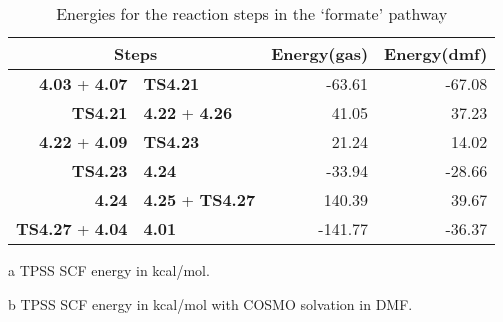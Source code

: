 \begin{table}[!htb]
\centering
 \begin{threeparttable}
  \caption{Energies for the reaction steps in the `formate' pathway}
    \begin{tabular}{r@{ $\rightarrow$ }lrr}
    \toprule
    \multicolumn{2}{c}{Steps} & Energy(gas)\tnote{a} & Energy(dmf)\tnote{b} \\
    \midrule
    \textbf{4.03} + \textbf{4.07} & \textbf{TS4.21} & -63.61 & -67.08 \\
    \textbf{TS4.21} & \textbf{4.22} + \textbf{4.26} & 41.05 & 37.23 \\
    \textbf{4.22} + \textbf{4.09} & \textbf{TS4.23} & 21.24 & 14.02 \\
    \textbf{TS4.23} & \textbf{4.24} & -33.94 & -28.66 \\
    \textbf{4.24} & \textbf{4.25} + \textbf{TS4.27} & 140.39 & 39.67 \\
    \textbf{TS4.27} + \textbf{4.04} & \textbf{4.01} & -141.77 & -36.37 \\
    \bottomrule
    \end{tabular}%
    \begin{tablenotes}
    \item [a] TPSS SCF energy in kcal/mol.
    \item [b] TPSS SCF energy in kcal/mol with COSMO solvation in DMF.
    \end{tablenotes}
  \label{tab.formrxn}%
 \end{threeparttable}
\end{table}%

